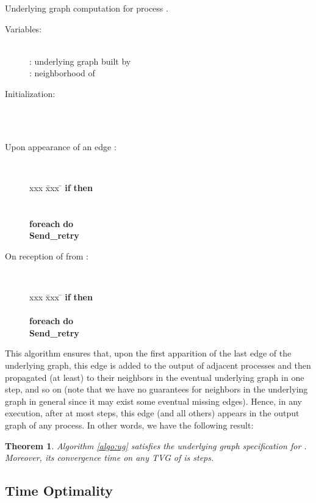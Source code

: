 \documentclass{article}
\newtheorem{theorem}{Theorem}
\begin{document}
\begin{algorithm}\caption{Underlying graph computation for process .}\label{algo:ug}
\begin{description}
\item[Variables:]~\\
: underlying graph built by \\
: neighborhood of 
\item[Initialization:]~\\
\\

\item[Upon appearance of an edge :]~
\begin{tabbing}
xxx \= xxx \= \kill 
\textbf{if}  \textbf{then}\\
\> \\
\> \\
\> \textbf{foreach}  \textbf{do}\\
\>\> \textbf{Send\_retry}
\end{tabbing}
\item[On reception of  from :]~
\begin{tabbing}
xxx \= xxx \= \kill 
\textbf{if}  \textbf{then}\\
\> \\
\> \textbf{foreach}  \textbf{do}\\
\>\> \textbf{Send\_retry}
\end{tabbing}
\end{description}
\end{algorithm}

This algorithm ensures that, upon the first apparition of the last edge of the underlying graph, this edge is added to the output of adjacent processes and then propagated (at least) to their neighbors in the eventual underlying graph in one step, and so on (note that we have no guarantees for neighbors in the underlying graph in general since it may exist some eventual missing edges). Hence, in any execution, after at most  steps, this edge (and all others) appears in the output graph of any process. In other words, we have the following result:

\begin{theorem}
Algorithm \ref{algo:ug} satisfies the underlying graph specification for . Moreover, its convergence time on any TVG  of  is  steps.
\end{theorem}

\subsection{Time Optimality}\label{sub:UGcomplexity}
\end{document}
